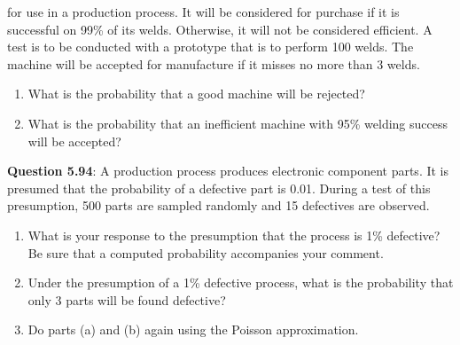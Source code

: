 \documentclass{article}
\begin{document}
    for use in a production process. It will be considered 
    for purchase if it is successful on 99\% of its welds. 
    Otherwise, it will not be considered efficient.
    A test is to be conducted with a prototype that is to
    perform 100 welds. The machine will be accepted for
    manufacture if it misses no more than 3 welds.
        \begin{enumerate}[label = (\alph*)]
            \item What is the probability that a good machine will
            be rejected?
            \item What is the probability that an inefficient machine
            with 95\% welding success will be accepted?
        \end{enumerate}
    \textbf{Question 5.94}: A production process produces electronic component 
    parts. It is presumed that the probability of a
    defective part is 0.01. During a test of this presumption, 
    500 parts are sampled randomly and 15 defectives
    are observed.
        \begin{enumerate}[label = (\alph*)]
            \item What is your response to the presumption that the
            process is 1\% defective? Be sure that a computed
            probability accompanies your comment.
            \item Under the presumption of a 1\% defective process,
            what is the probability that only 3 parts will be
            found defective?
            \item Do parts (a) and (b) again using the Poisson approximation.
        \end{enumerate}
\end{document}
